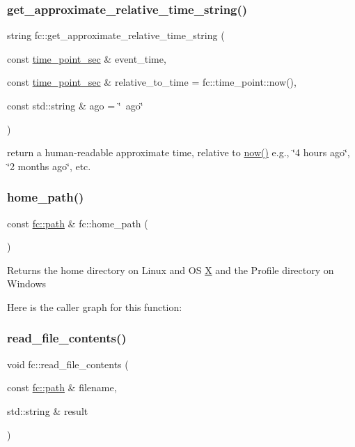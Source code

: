 \subsubsection{\texorpdfstring{get\+\_\+approximate\+\_\+relative\+\_\+time\+\_\+string()}{get\_approximate\_relative\_time\_string()}}
{\footnotesize\ttfamily string fc\+::get\+\_\+approximate\+\_\+relative\+\_\+time\+\_\+string (\begin{DoxyParamCaption}\item[{const \mbox{\hyperlink{classfc_1_1time__point__sec}{time\+\_\+point\+\_\+sec}} \&}]{event\+\_\+time,  }\item[{const \mbox{\hyperlink{classfc_1_1time__point__sec}{time\+\_\+point\+\_\+sec}} \&}]{relative\+\_\+to\+\_\+time = {\ttfamily fc\+:\+:time\+\_\+point\+:\+:now()},  }\item[{const std\+::string \&}]{ago = {\ttfamily \char`\"{}~ago\char`\"{}} }\end{DoxyParamCaption})}

return a human-\/readable approximate time, relative to \mbox{\hyperlink{group__systemcapi_ga5eef43c9589d6ef54a0ece1dda5e0ffe}{now()}} e.\+g., \char`\"{}4 hours ago\char`\"{}, \char`\"{}2 months ago\char`\"{}, etc. \mbox{\label{namespacefc_a638386a755d79377ef4c5c779c731e43}} 
\subsubsection{\texorpdfstring{home\+\_\+path()}{home\_path()}}
{\footnotesize\ttfamily const \mbox{\hyperlink{classfc_1_1path}{fc\+::path}} \& fc\+::home\+\_\+path (\begin{DoxyParamCaption}{ }\end{DoxyParamCaption})}

\begin{DoxyReturn}{Returns}
the home directory on Linux and OS \mbox{\hyperlink{class_x}{X}} and the Profile directory on Windows 
\end{DoxyReturn}
Here is the caller graph for this function\+:
\mbox{\label{namespacefc_a23ea7ee1b75c710ca0ba138e94395ed1}} 
\subsubsection{\texorpdfstring{read\+\_\+file\+\_\+contents()}{read\_file\_contents()}}
{\footnotesize\ttfamily void fc\+::read\+\_\+file\+\_\+contents (\begin{DoxyParamCaption}\item[{const \mbox{\hyperlink{classfc_1_1path}{fc\+::path}} \&}]{filename,  }\item[{std\+::string \&}]{result }\end{DoxyParamCaption})}

